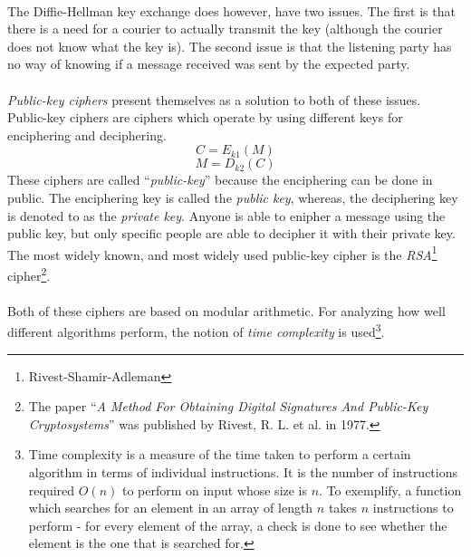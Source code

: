 \documentclass[a4paper, 10pt]{article}
\begin{document}
\paragraph*{}
The Diffie-Hellman key exchange does however, have two issues. The first is that there is a need for a courier to 
actually transmit the key (although the courier does not know what the key is). The second issue is that the listening 
party has no way of knowing if a message received was sent by the expected party.

\paragraph*{}
\textit{Public-key ciphers} present themselves as a solution to both of these issues. Public-key ciphers are ciphers 
which operate by using different keys for enciphering and deciphering.
\begin{equation} \label{pk-encipher}
C = E_{k1}(M)
\end{equation}
\begin{equation} \label{pk-decipher}
M = D_{k2}(C)
\end{equation}
These ciphers are called ``\textit{public-key}'' because the enciphering can be done in public. The enciphering key is 
called the \textit{public key}, whereas, the deciphering key is denoted to as the \textit{private key}. Anyone is able 
to enipher a message using the public key, but only specific people are able to decipher it with their private key. The
 most widely known, and most widely used public-key cipher is the \textit{RSA}\footnote{Rivest-Shamir-Adleman} 
cipher\footnote{The paper ``\textit{A Method For Obtaining Digital Signatures And Public-Key Cryptosystems}'' was published
 by Rivest, R. L. et al. in 1977.}.

\paragraph*{}
Both of these ciphers are based on modular arithmetic. For analyzing how well different algorithms perform, the notion 
of \textit{time complexity} is used\footnote{Time complexity is a measure of the time taken to perform a certain 
algorithm in terms of individual instructions. It is the number of instructions required $O(n)$ to perform on input 
whose size is $n$. To exemplify, a function which searches for an element in an array of length $n$ takes $n$ 
instructions to perform - for every element of the array, a check is done to see whether the element is the one that is
 searched for.}.
\end{document}
